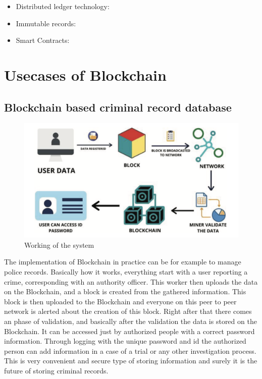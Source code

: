\documentclass[10pt,english,a4paper]{article}
\begin{document}
\begin{itemize}
    \item Distributed ledger technology:
    \item Immutable records:
    \item Smart Contracts:
\end{itemize}
   
  
\section{Usecases of Blockchain}\label{Blockchain}
\subsection{Blockchain based criminal record database}
\begin{figure}
    \centering
    \includegraphics[scale=0.2]{Implemantation of criminal records database.png}
    \caption{Working of the system\cite{Jain:Criminal:record}}
    \label{histogram}
\end{figure}
The implementation of Blockchain in practice can be for example to manage police records. Basically how it works, everything start with a user reporting a crime, corresponding with an authority officer. This worker then uploads the data on the Blockchain, and a block is created from the gathered information. This block is then uploaded to the Blockchain and everyone on this peer to peer network is alerted about the creation of this block. Right after that there comes an phase of validation, and basically after the validation the data is stored on the Blockchain. It can be accessed just by authorized people with a correct password information. Through logging with the unique password and id the authorized person can add information in a case of a trial or any  other investigation process. This is very convenient and secure type of storing information and surely it is the future of storing criminal records.
\end{document}
